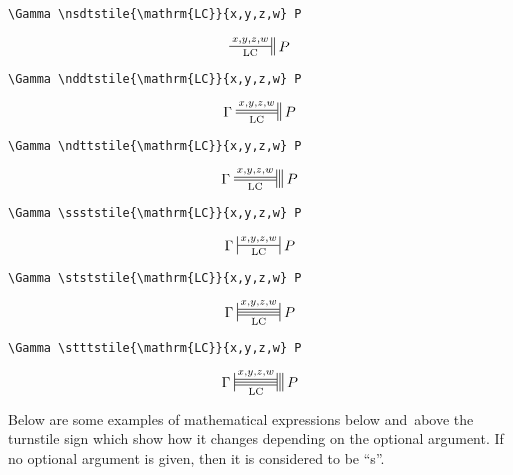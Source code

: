 \documentclass{pracjourn}
\begin{document}
\begin{verbatim}
\Gamma \nsdtstile{\mathrm{LC}}{x,y,z,w} P
\end{verbatim}
\begin{equation}  \nsdtstile{\mathrm{LC}}{x,y,z,w} P\end{equation} \vspace{0.4em}

\begin{verbatim}
\Gamma \nddtstile{\mathrm{LC}}{x,y,z,w} P
\end{verbatim}
\begin{equation}\Gamma \nddtstile{\mathrm{LC}}{x,y,z,w} P\end{equation} \vspace{0.4em}

\begin{verbatim}
\Gamma \ndttstile{\mathrm{LC}}{x,y,z,w} P
\end{verbatim}
\begin{equation}\Gamma \ndttstile{\mathrm{LC}}{x,y,z,w} P\end{equation} \vspace{0.4em}
 
\pagebreak

\begin{verbatim}
\Gamma \ssststile{\mathrm{LC}}{x,y,z,w} P
\end{verbatim}
\begin{equation}\Gamma \ssststile{\mathrm{LC}}{x,y,z,w} P\end{equation} \vspace{0.4em}


\begin{verbatim}
\Gamma \stststile{\mathrm{LC}}{x,y,z,w} P
\end{verbatim}
\begin{equation}\Gamma \stststile{\mathrm{LC}}{x,y,z,w} P\end{equation} \vspace{0.4em}

\begin{verbatim}
\Gamma \stttstile{\mathrm{LC}}{x,y,z,w} P
\end{verbatim}
\begin{equation}\Gamma \stttstile{\mathrm{LC}}{x,y,z,w} P\end{equation} \vspace{0.4em}

Below are some examples of mathematical expressions below and~above the turnstile sign which show how it changes depending on the optional argument. If no optional argument is given, then it is considered to be ``s''.
\end{document}
